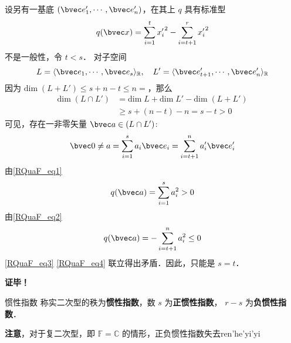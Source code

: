 设另有一基底 $(\bvec e'_1,\cdots,\bvec e'_n)$，在其上 $q$ 具有标准型
\begin{equation}\label{RQuaF_eq2}
q(\bvec x)=\sum_{i=1}^{t}{x'_i}^2-\sum_{i=t+1}^{r} {x'_{i}}^{2}
\end{equation}
不是一般性，令 $t<s$．
对子空间
\begin{equation}
L=\langle \bvec e_1,\cdots,\bvec e_s\rangle_\mathbb{R},\quad L'=\langle \bvec e'_{t+1},\cdots,\bvec e'_n\rangle_\mathbb{R}
\end{equation}
因为 $\mathrm{dim}\;(L+L')\leq s+n-t\leq n=$，那么
\begin{equation}
\begin{aligned}
\mathrm{dim}\;(L\cap L')&=\mathrm{dim}\; L+\mathrm{dim}\; L'-\mathrm{dim}\;(L+L')\\
&\geq s+(n-t)-n=s-t> 0
\end{aligned}
\end{equation}
可见，存在一非零矢量 $\bvec a\in(L\cap L')$:
\begin{equation}
\bvec 0\neq a=\sum_{i=1}^s a_i\bvec e_i=\sum_{i=t+1}^n a'_i \bvec e'_i
\end{equation}
由\autoref{RQuaF_eq1} 
\begin{equation}\label{RQuaF_eq3}
q(\bvec a)=\sum_{i=1}^s a_i^2>0
\end{equation}
由\autoref{RQuaF_eq2} 
\begin{equation}\label{RQuaF_eq4}
q(\bvec a)=-\sum_{i=t+1}^n a_i^2\leq 0
\end{equation}
\autoref{RQuaF_eq3} \autoref{RQuaF_eq4} 联立得出矛盾．因此，只能是 $s=t$．

\textbf{证毕！}
\begin{definition}{惯性指数}
称实二次型的秩为\textbf{惯性指数}，数 $s$ 为\textbf{正惯性指数}， $r-s$ 为\textbf{负惯性指数}．
\end{definition}

\textbf{注意}，对于复二次型，即 $\mathbb F=\mathbb C$ 的情形，正负惯性指数失去ren'he'yi'yi